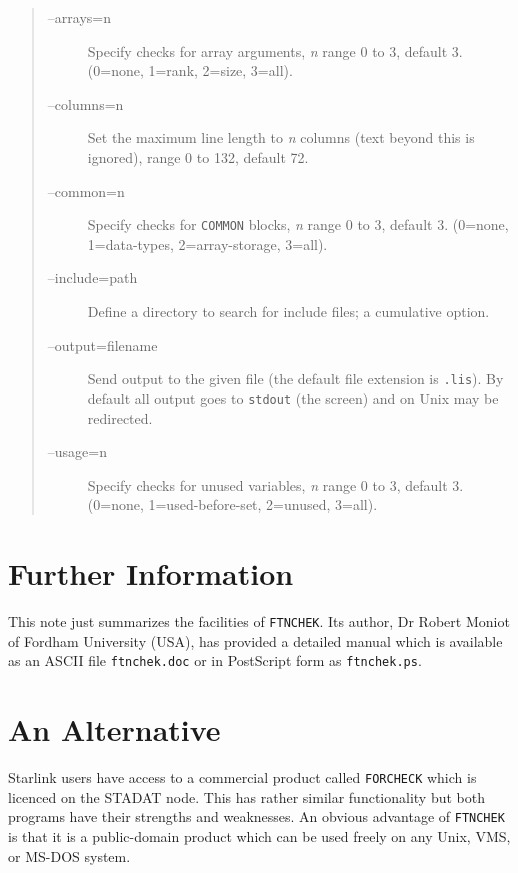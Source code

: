\documentclass[twoside,11pt,nolof]{starlink}
\begin{document}
\begin{quote}
\begin{description}

\item [--arrays=n] Specify checks for array arguments, \textit{n} range 0
to 3, default 3. (0=none, 1=rank, 2=size, 3=all).

\item [--columns=n] Set the maximum line length to \textit{n} columns (text
beyond this is ignored), range 0 to 132, default 72.

\item [--common=n] Specify checks for \texttt{COMMON} blocks, \textit{n}
range 0 to 3, default 3.  (0=none, 1=data-types, 2=array-storage,
3=all).

\item [--include=path] Define a directory to search for include files; a
cumulative option.

\item [--output=filename] Send output to the given file (the default
file extension is \texttt{.lis}). By default all output goes to \texttt{stdout} (the screen) and on Unix may be redirected.

\item [--usage=n] Specify checks for unused variables, \textit{n} range
0 to 3, default 3. (0=none, 1=used-before-set, 2=unused, 3=all).

\end{description}
\end{quote}

\section{Further Information}

This note just summarizes the facilities of \texttt{FTNCHEK}. Its author,
Dr Robert Moniot of Fordham University (USA), has provided a detailed
manual which is available as an ASCII file \texttt{ftnchek.doc} or in
PostScript form as \texttt{ftnchek.ps}.

\section{An Alternative}

Starlink users have access to a commercial product called \texttt{FORCHECK}
which is licenced on the STADAT node.  This has rather similar
functionality but both programs have their strengths and
weaknesses. An obvious advantage of \texttt{FTNCHEK} is that it is a
public-domain product which can be used freely on any Unix, VMS, or
MS-DOS system.
\end{document}
